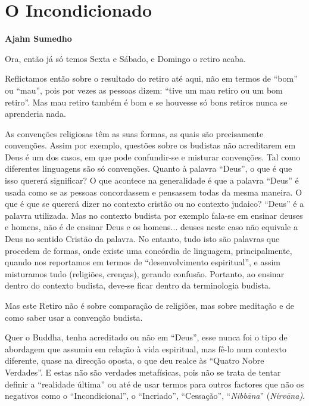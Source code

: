\chapter{O Incondicionado}

\textbf{Ajahn Sumedho}

Ora, então já só temos Sexta e Sábado, e Domingo o retiro acaba.

Reflictamos então sobre o resultado do retiro até aqui, não em termos de
``bom'' ou ``mau'', pois por vezes as pessoas dizem: ``tive um mau
retiro ou um bom retiro''. Mas mau retiro também é bom e se houvesse só
bons retiros nunca se aprenderia nada.

As convenções religiosas têm as suas formas, as quais são precisamente
convenções. Assim por exemplo, questões sobre os budistas não
acreditarem em Deus é um dos casos, em que pode confundir-se e misturar
convenções. Tal como diferentes linguagens são só convenções. Quanto à
palavra ``Deus'', o que é que isso quererá significar? O que acontece na
generalidade é que a palavra ``Deus'' é usada como se as pessoas
concordassem e pensassem todas da mesma maneira. O que é que se quererá
dizer no contexto cristão ou no contexto judaico? ``Deus'' é a palavra
utilizada. Mas no contexto budista por exemplo fala-se em ensinar deuses
e homens, não é de ensinar Deus e os homens... deuses neste caso não
equivale a Deus no sentido Cristão da palavra. No entanto, tudo isto são
palavras que procedem de formas, onde existe uma concórdia de linguagem,
principalmente, quando nos reportamos em termos de ``desenvolvimento
espiritual'', e assim misturamos tudo (religiões, crenças), gerando
confusão. Portanto, ao ensinar dentro do contexto budista, deve-se ficar
dentro da terminologia budista.

Mas este Retiro não é sobre comparação de religiões, mas sobre meditação
e de como saber usar a convenção budista.

Quer o Buddha, tenha acreditado ou não em ``Deus'', esse nunca foi o
tipo de abordagem que assumiu em relação à vida espiritual, mas fê-lo
num contexto diferente, quase na direcção oposta, o que deu realce às
``Quatro Nobre Verdades''. E estas não são verdades metafísicas, pois
não se trata de tentar definir a ``realidade última'' ou até de usar
termos para outros factores que não os negativos como o
``Incondicional'', o ``Incriado'', ``Cessação'', ``\emph{Nibbāna}''
(\emph{Nirvāna)}.

